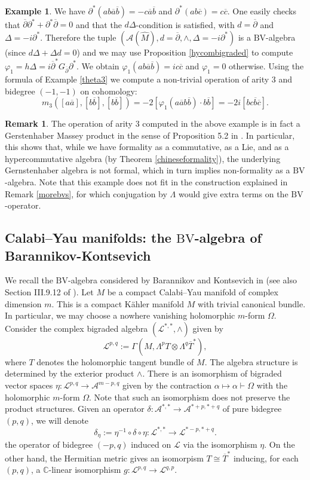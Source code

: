 \documentclass[a4paper]{amsart}
\theoremstyle{definition}
\newtheorem{rema}[theo]{Remark}
\newtheorem{exam}[theo]{Example}
\theoremstyle{theorem}
\newcommand{\CC}{\mathbb{C}}
\newcommand{\Aa}{\mathcal{A}}
\newcommand{\Ll}{\mathcal{L}}
\newcommand{\ov}{\overline}
\newcommand{\del}{\partial}
\newcommand{\delb}{{\overline\partial}}
\newcommand{\BV}{{\mathrm{BV}}}
\begin{document}
\begin{exam}
We have 
$\del^*(ab\ov a\ov b)=-c\ov a\ov b$ and $\del^*(ab\ov c)=c\ov c$.
One easily checks that 
$\delb\del^*+\del^*\delb=0$ and that the $d\Delta$-condition is satisfied, with $d=\delb$ and $\Delta=-i\del^*$. Therefore the tuple $(\Aa(\widehat{M}), d=\delb,\wedge,\Delta=-i\del^*)$ is a $\BV$-algebra (since $d\Delta+\Delta d=0$)
and we may use Proposition \ref{hycombigraded} to compute
$\varphi_1=h\Delta=i\delb^* G_{\delb}\del^*$. We obtain
$\varphi_1(a b \ov a\ov b)=i c\ov c$ and $\varphi_1=0$ otherwise.
Using the formula of Example \ref{theta3} we compute a non-trivial operation of arity 3 and bidegree $(-1,-1)$ on cohomology: 
\[
m_3([a\ov a], [b\ov b], [b\ov b])=-2[\varphi_1(a\ov ab\ov b)\cdot b\ov b]=-2i[bc\ov b\ov c].
\]
\end{exam}



\begin{rema}
The operation of arity 3 computed in the above example is in fact a Gerstenhaber Massey product in the sense of Proposition 5.2 in \cite{Muro}.
In particular, this shows that,
while we have formality as a commutative, as a Lie, and as a hypercommutative algebra (by Theorem \ref{chineseformality}),
 the underlying Gernstenhaber algebra is not formal,
which in turn implies non-formality as a $\BV$-algebra. Note that this example does not fit in the construction explained in Remark \ref{morebvs}, for which conjugation by $\Lambda$ would give extra terms on the $\BV$-operator.
\end{rema}



\subsection{Calabi--Yau manifolds: the $\BV$-algebra of Barannikov-Kontsevich}\label{BVBK}
We recall the $\BV$-algebra considered by Barannikov and Kontsevich in \cite{BaKo} (see also Section III.9.12 of \cite{Maninbook}).
Let $M$ be a compact Calabi--Yau manifold of complex dimension $m$. This is a compact Kähler manifold $M$ with trivial canonical bundle. In particular, we may choose a nowhere vanishing holomorphic $m$-form $\Omega$.
Consider the complex bigraded algebra $(\Ll^{*,*},\wedge)$ given by 
\[\Ll^{p,q}:=\Gamma(M,\Lambda^p T\otimes \Lambda^q\ov{T}^*),\]
where $T$ denotes the holomorphic tangent bundle of $M$. The algebra structure is determined by 
the
exterior product $\wedge$.
There is an isomorphism of bigraded vector spaces $\eta:\Ll^{p,q}\to \Aa^{m-p,q}$ given by the contraction $\alpha\mapsto \alpha \vdash \Omega$
with the holomorphic $m$-form $\Omega$. Note that such an isomorphism does not preserve the product structures.
Given an operator $\delta:\Aa^{*,*}\to \Aa^{*+p,*+q}$ of pure bidegree $(p,q)$, we will denote 
\[\delta_\eta:=\eta^{-1}\circ\delta\circ \eta:\Ll^{*,*}\to \Ll^{*-p,*+q}.\]
the operator of bidegree $(-p,q)$ induced on $\Ll$ via the isomorphism $\eta$.
On the other hand, the Hermitian metric gives an isomorpism $T\cong \ov{T}^*$ inducing, for each $(p,q)$, a $\CC$-linear isomorphism
$g:\Ll^{p,q}\to \Ll^{q,p}$.
\end{document}
